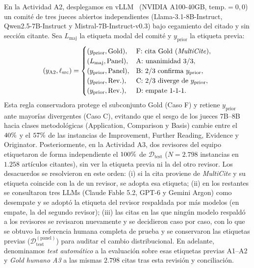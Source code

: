 \documentclass[conference]{IEEEtran}
\newcommand{\pct}{\mbox{\symbol{37}}}
\begin{document}
En la Actividad A2, desplegamos en vLLM~\cite{kwon2023efficient} (NVIDIA A100-40GB, $\text{temp.}=0,0$) un comité de tres jueces abiertos independientes (Llama-3.1-8B-Instruct, Qwen2.5-7B-Instruct y Mistral-7B-Instruct-v0.3) bajo cegamiento del citado y sin sección citante. Sea $L_{\text{maj}}$ la etiqueta modal del comité y $y_{\text{prior}}$ la etiqueta previa:
\begin{equation}
\label{eq:reglas_consenso_panel}
(y_{\text{A2}}, \ell_{\text{src}}) = \begin{cases}
(y_{\text{prior}}, \text{Gold}), & \text{F: cita Gold (\textit{MultiCite})}, \\
(L_{\text{maj}}, \text{Panel}), & \text{A: unanimidad } 3/3, \\
(y_{\text{prior}}, \text{Panel}), & \text{B: } 2/3 \text{ confirma } y_{\text{prior}}, \\
(y_{\text{prior}}, \text{Rev.}), & \text{C: } 2/3 \text{ diverge de } y_{\text{prior}}, \\
(y_{\text{prior}}, \text{Rev.}), & \text{D: empate } 1\text{-}1\text{-}1.
\end{cases}
\end{equation}
Esta regla conservadora protege el subconjunto Gold (Caso F) y retiene $y_{\text{prior}}$ ante mayorías divergentes (Caso C), evitando que el sesgo de los jueces 7B--8B hacia clases metodológicas (Application, Comparison y Basis) cambie entre el $40\pct{}$ y el $57\pct{}$ de las instancias de Improvement, Further Reading, Evidence y Originator. Posteriormente, en la Actividad A3, dos revisores del equipo etiquetaron de forma independiente el $100\pct{}$ de $\mathcal{D}_{\text{test}}$ ($N = 2.798$ instancias en $1.258$ artículos citantes), sin ver la etiqueta previa ni la del otro revisor. Los desacuerdos se resolvieron en este orden: (i) si la cita proviene de \textit{MultiCite} y su etiqueta coincide con la de un revisor, se adopta esa etiqueta; (ii) en los restantes se consultaron tres LLMs (Claude Fable 5.2, GPT-6 y Gemini Argon) como desempate y se adoptó la etiqueta del revisor respaldada por más modelos (en empate, la del segundo revisor); (iii) las citas en las que ningún modelo respaldó a los revisores se revisaron nuevamente y se decidieron caso por caso, con lo que se obtuvo la referencia humana completa de prueba y se conservaron las etiquetas previas ($\mathcal{D}_{\text{test}}^{(\text{panel})}$) para auditar el cambio distribucional. En adelante, denominamos \textit{test automático} a la evaluación sobre esas etiquetas previas A1--A2 y \textit{Gold humano A3} a las mismas $2.798$ citas tras esta revisión y conciliación.
\end{document}
